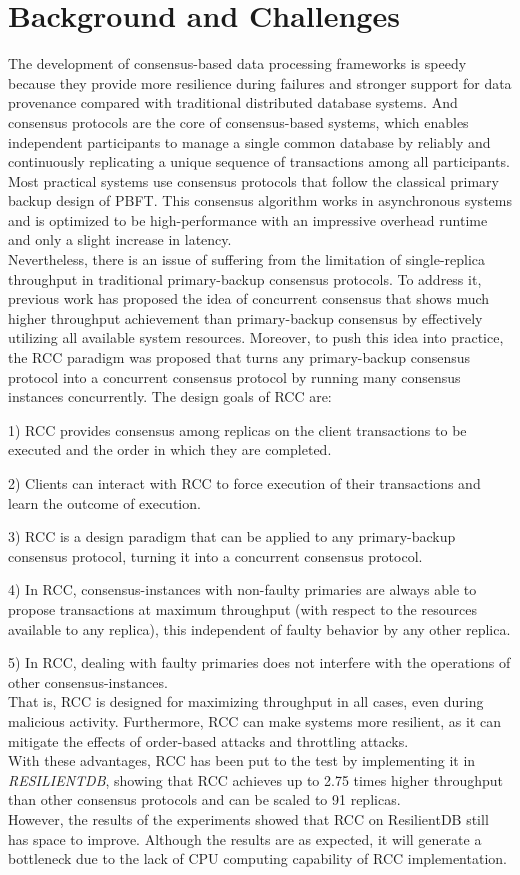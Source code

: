 \section{Background and Challenges}
The development of consensus-based data processing frameworks is speedy because they provide more resilience during failures and stronger support for data provenance compared with traditional distributed database systems. And consensus protocols are the core of consensus-based systems, which enables independent participants to manage a single common database by reliably and continuously replicating a unique sequence of transactions among all participants. Most practical systems use consensus protocols that follow the classical primary backup design of PBFT. This consensus algorithm works in asynchronous systems and is optimized to be high-performance with an impressive overhead runtime and only a slight increase in latency.\\
Nevertheless, there is an issue of suffering from the limitation of single-replica throughput in traditional primary-backup consensus protocols. To address it, previous work has proposed the idea of concurrent consensus that shows much higher throughput achievement than primary-backup consensus by effectively utilizing all available system resources. Moreover, to push this idea into practice, the RCC paradigm was proposed that turns any primary-backup consensus protocol into a concurrent consensus protocol by running many consensus instances concurrently. The design goals of RCC are:
    \item 1) RCC provides consensus among replicas on the client transactions to be executed and the order in which they are completed.
    \item 2) Clients can interact with RCC to force execution of their transactions and learn the outcome of execution.
    \item 3) RCC is a design paradigm that can be applied to any primary-backup consensus protocol, turning it into a concurrent consensus protocol.
    \item 4) In RCC, consensus-instances with non-faulty primaries are always able to propose transactions at maximum throughput (with respect to the resources available to any replica), this independent of faulty behavior by any other replica.
    \item 5) In RCC, dealing with faulty primaries does not interfere with the operations of other consensus-instances.\\
That is, RCC is designed for maximizing throughput in all cases, even during malicious activity. Furthermore, RCC can make systems more resilient, as it can mitigate the effects of order-based attacks and throttling attacks.\\
With these advantages, RCC has been put to the test by implementing it in \textit{RESILIENTDB}, showing that RCC achieves up to 2.75 times higher throughput than other consensus protocols and can be scaled to 91 replicas.\\
However, the results of the experiments showed that RCC on ResilientDB still has space to improve. Although the results are as expected, it will generate a bottleneck due to the lack of CPU computing capability of RCC implementation. 